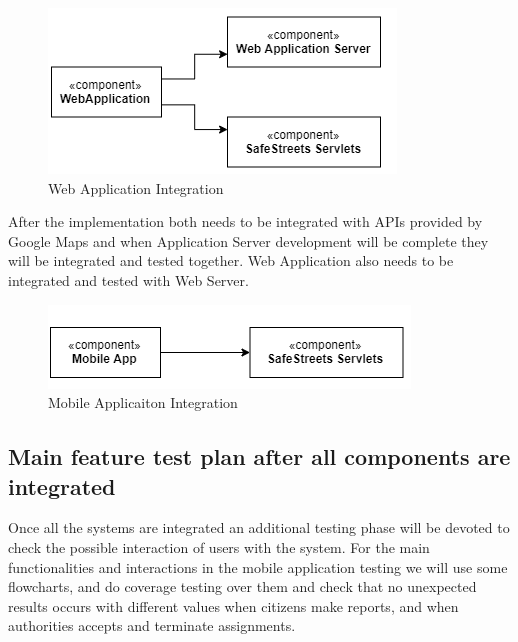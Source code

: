\begin{figure}[H]
\centering
\includegraphics{Images/IntegrationWeb.png}
\caption{\label{fig:ComWI}Web Application Integration}
\end{figure}
After the implementation both needs to be integrated with APIs provided by Google Maps and when
Application Server development will be complete they will be integrated and tested together. Web Application also needs to be integrated and tested with Web Server.

\begin{figure}[H]
\centering
\includegraphics{Images/IntegrationMobile.png}
\caption{\label{fig:ComWI}Mobile Applicaiton Integration}
\end{figure}
\newpage
\subsection{Main feature test plan after all components are integrated}
Once all the systems are integrated an additional testing phase will be devoted to check the possible interaction of users with the system. For the main functionalities and interactions in the mobile application
testing we will use some flowcharts, and do coverage testing over them and check that no unexpected results occurs with different values when citizens make reports, and when authorities accepts and terminate assignments.

